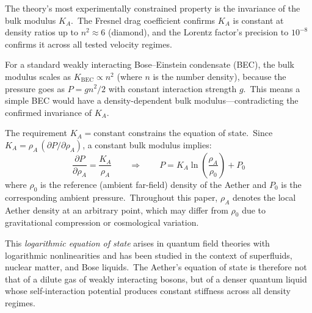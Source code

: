 ﻿\documentclass[12pt,letterpaper]{article}
\newcommand{\rhoa}{\rho_{\!A}}
\newcommand{\Ka}{K_{\!A}}
\begin{document}
The theory's most experimentally constrained property is the invariance of the
bulk modulus $\Ka$.\ The Fresnel drag coefficient confirms $\Ka$ is constant at
density ratios up to $n^2 \approx 6$ (diamond), and the Lorentz factor's
precision to $10^{-8}$ confirms it across all tested velocity regimes.

For a standard weakly interacting Bose--Einstein condensate (BEC), the bulk
modulus scales as $K_{\mathrm{BEC}} \propto n^2$ (where $n$ is the number
density), because the pressure goes as $P = g n^2/2$ with constant interaction
strength $g$.\ This means a simple BEC would have a density-dependent bulk
modulus---contradicting the confirmed invariance of $\Ka$.

The requirement $\Ka = \text{constant}$ constrains the equation of state.\ Since
$\Ka = \rhoa\,(\partial P / \partial \rhoa)$, a constant bulk modulus implies:
%
\begin{equation}
  \frac{\partial P}{\partial \rhoa} = \frac{\Ka}{\rhoa}
  \qquad\Longrightarrow\qquad
  P = \Ka \ln\!\left(\frac{\rhoa}{\rho_0}\right) + P_0
\end{equation}
%
where $\rho_0$ is the reference (ambient far-field) density of the Aether and
$P_0$ is the corresponding ambient pressure.\ Throughout this paper, $\rhoa$
denotes the local Aether density at an arbitrary point, which may differ from
$\rho_0$ due to gravitational compression or cosmological variation.

This \emph{logarithmic equation of state} arises in quantum field theories with
logarithmic nonlinearities \cite{rosen1969,zloshchastiev2011} and has been studied in the context of
superfluids, nuclear matter, and Bose liquids.\ The Aether's equation of state
is therefore not that of a dilute gas of weakly interacting bosons, but of a
denser quantum liquid whose self-interaction potential produces constant
stiffness across all density regimes.
\end{document}
